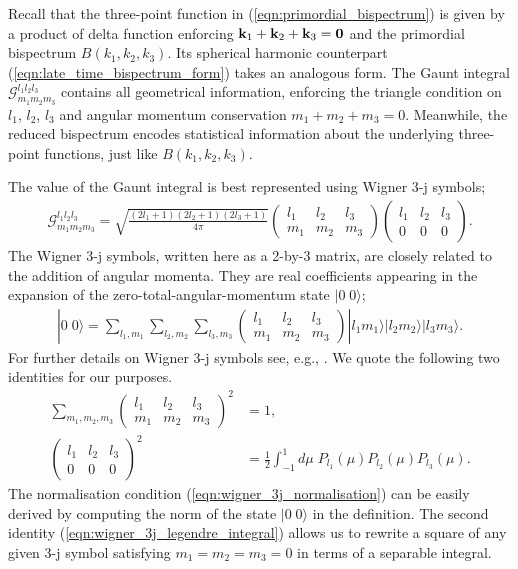 Recall that the three-point function in (\ref{eqn:primordial_bispectrum}) is given by a product of delta function enforcing $\mathbf{k}_1 + \mathbf{k}_2 + \mathbf{k}_3 = \mathbf{0}$ and the primordial bispectrum $B(k_1,k_2,k_3)$. Its spherical harmonic counterpart (\ref{eqn:late_time_bispectrum_form}) takes an analogous form. The Gaunt integral $\mathcal{G}^{l_1 l_2 l_3}_{m_1 m_2 m_3}$ contains all geometrical information, enforcing the triangle condition on $l_1$, $l_2$, $l_3$ and angular momentum conservation $m_1+m_2+m_3=0$. Meanwhile, the reduced bispectrum encodes statistical information about the underlying three-point functions, just like $B(k_1,k_2,k_3)$.

The value of the Gaunt integral is best represented using Wigner 3-j symbols;
\begin{align}
	\mathcal{G}^{l_1 l_2 l_3}_{m_1 m_2 m_3} = \sqrt{\frac{(2l_1+1)(2l_2+1)(2l_3+1)}{4\pi}} \begin{pmatrix}	l_1 & l_2 & l_3 \\ m_1 & m_2 & m_3 \end{pmatrix} \begin{pmatrix}	l_1 & l_2 & l_3 \\ 0 & 0 & 0 \end{pmatrix}.
\end{align}
The Wigner 3-j symbols, written here as a 2-by-3 matrix, are closely related to the addition of angular momenta. They are real coefficients appearing in the expansion of the zero-total-angular-momentum state $|0 \; 0\rangle$;
\begin{align}
	| 0 \; 0 \rangle = \sum_{l_1,m_1} \sum_{l_2,m_2} \sum_{l_3,m_3} \begin{pmatrix}	l_1 & l_2 & l_3 \\ m_1 & m_2 & m_3 \end{pmatrix} | l_1 m_1 \rangle | l_2 m_2 \rangle | l_3 m_3 \rangle.
\end{align}
For further details on Wigner 3-j symbols see, e.g., \cite{Olver2010nist}. We quote the following two identities for our purposes.
\begin{align}
	\sum_{m_1,m_2,m_3} { \begin{pmatrix}	l_1 & l_2 & l_3 \\ m_1 & m_2 & m_3 \end{pmatrix} }^2 &= 1, \label{eqn:wigner_3j_normalisation} \\
	{ \begin{pmatrix}	l_1 & l_2 & l_3 \\ 0 & 0 & 0 \end{pmatrix} }^2 &= \frac{1}{2} \int_{-1}^{1} d\mu \; P_{l_1}(\mu) P_{l_2}(\mu) P_{l_3}(\mu). \label{eqn:wigner_3j_legendre_integral} 
\end{align}
The normalisation condition (\ref{eqn:wigner_3j_normalisation}) can be easily derived by computing the norm of the state $|0 \; 0 \rangle$ in the definition. The second identity (\ref{eqn:wigner_3j_legendre_integral}) allows us to rewrite a square of any given 3-j symbol satisfying $m_1=m_2=m_3=0$ in terms of a separable integral.

